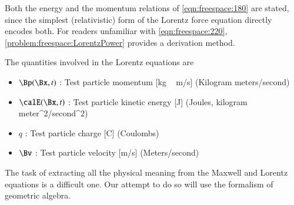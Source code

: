 Both the energy and the momentum relations of \cref{eqn:freespace:180} are stated, since
the simplest (relativistic) form of the Lorentz force equation directly encodes both.
For readers unfamiliar with \cref{eqn:freespace:220}, \cref{problem:freespace:LorentzPower} provides a derivation method.

The quantities involved in the Lorentz equations are

\begin{itemize}
	\item \( \Bp(\Bx, t) \) : Test particle momentum [\si{kg\, m/s}] (Kilogram meters/second)
	\item \( \calE(\Bx, t) \) : Test particle kinetic energy [\si{J}] (Joules, kilogram meter^2/second^2)
	\item \( q \) : Test particle charge [\si{C}] (Coulombs)
	\item \( \Bv \) : Test particle velocity [\si{m/s}] (Meters/second)
\end{itemize}

The task of extracting all the physical meaning from the Maxwell and Lorentz equations is a difficult one.
Our attempt to do so will use the formalism of geometric algebra.

